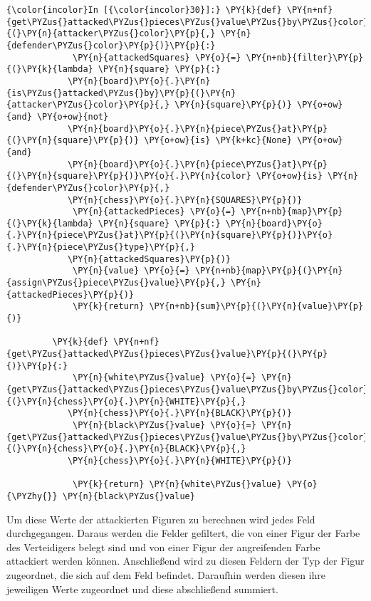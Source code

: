     \begin{Verbatim}[commandchars=\\\{\}]
{\color{incolor}In [{\color{incolor}30}]:} \PY{k}{def} \PY{n+nf}{get\PYZus{}attacked\PYZus{}pieces\PYZus{}value\PYZus{}by\PYZus{}color}\PY{p}{(}\PY{n}{attacker\PYZus{}color}\PY{p}{,} \PY{n}{defender\PYZus{}color}\PY{p}{)}\PY{p}{:}
             \PY{n}{attackedSquares} \PY{o}{=} \PY{n+nb}{filter}\PY{p}{(}\PY{k}{lambda} \PY{n}{square} \PY{p}{:} 
			\PY{n}{board}\PY{o}{.}\PY{n}{is\PYZus{}attacked\PYZus{}by}\PY{p}{(}\PY{n}{attacker\PYZus{}color}\PY{p}{,} \PY{n}{square}\PY{p}{)} \PY{o+ow}{and} \PY{o+ow}{not} 
			\PY{n}{board}\PY{o}{.}\PY{n}{piece\PYZus{}at}\PY{p}{(}\PY{n}{square}\PY{p}{)} \PY{o+ow}{is} \PY{k+kc}{None} \PY{o+ow}{and} 
			\PY{n}{board}\PY{o}{.}\PY{n}{piece\PYZus{}at}\PY{p}{(}\PY{n}{square}\PY{p}{)}\PY{o}{.}\PY{n}{color} \PY{o+ow}{is} \PY{n}{defender\PYZus{}color}\PY{p}{,} 
			\PY{n}{chess}\PY{o}{.}\PY{n}{SQUARES}\PY{p}{)}
             \PY{n}{attackedPieces} \PY{o}{=} \PY{n+nb}{map}\PY{p}{(}\PY{k}{lambda} \PY{n}{square} \PY{p}{:} \PY{n}{board}\PY{o}{.}\PY{n}{piece\PYZus{}at}\PY{p}{(}\PY{n}{square}\PY{p}{)}\PY{o}{.}\PY{n}{piece\PYZus{}type}\PY{p}{,} 
			\PY{n}{attackedSquares}\PY{p}{)}
             \PY{n}{value} \PY{o}{=} \PY{n+nb}{map}\PY{p}{(}\PY{n}{assign\PYZus{}piece\PYZus{}value}\PY{p}{,} \PY{n}{attackedPieces}\PY{p}{)}
             \PY{k}{return} \PY{n+nb}{sum}\PY{p}{(}\PY{n}{value}\PY{p}{)}
              
         \PY{k}{def} \PY{n+nf}{get\PYZus{}attacked\PYZus{}pieces\PYZus{}value}\PY{p}{(}\PY{p}{)}\PY{p}{:}
             \PY{n}{white\PYZus{}value} \PY{o}{=} \PY{n}{get\PYZus{}attacked\PYZus{}pieces\PYZus{}value\PYZus{}by\PYZus{}color}\PY{p}{(}\PY{n}{chess}\PY{o}{.}\PY{n}{WHITE}\PY{p}{,} 
			\PY{n}{chess}\PY{o}{.}\PY{n}{BLACK}\PY{p}{)}
             \PY{n}{black\PYZus{}value} \PY{o}{=} \PY{n}{get\PYZus{}attacked\PYZus{}pieces\PYZus{}value\PYZus{}by\PYZus{}color}\PY{p}{(}\PY{n}{chess}\PY{o}{.}\PY{n}{BLACK}\PY{p}{,} 
			\PY{n}{chess}\PY{o}{.}\PY{n}{WHITE}\PY{p}{)}
             
             \PY{k}{return} \PY{n}{white\PYZus{}value} \PY{o}{\PYZhy{}} \PY{n}{black\PYZus{}value}
\end{Verbatim}

    Um diese Werte der attackierten Figuren zu berechnen wird jedes Feld
durchgegangen. Daraus werden die Felder gefiltert, die von einer Figur
der Farbe des Verteidigers belegt sind und von einer Figur der
angreifenden Farbe attackiert werden können. Anschließend wird zu diesen
Feldern der Typ der Figur zugeordnet, die sich auf dem Feld befindet.
Daraufhin werden diesen ihre jeweiligen Werte zugeordnet und diese
abschließend summiert.

